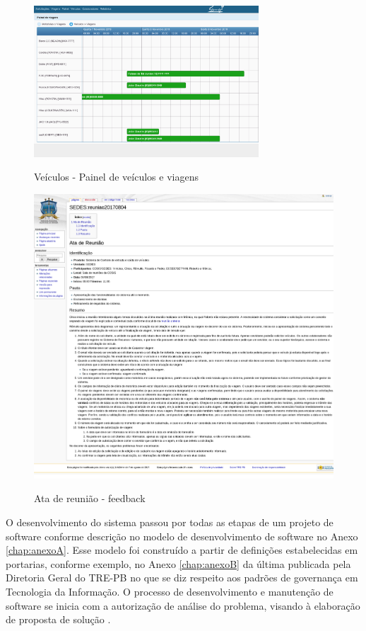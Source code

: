 \begin{figure}[!htb]
    \centering
    \caption{Veículos - Painel de veículos e viagens}
    \includegraphics[width=0.75\textwidth]{./dados/figuras/veiculos-tela2.png}
    \label{fig:figura-motoristas}
\end{figure}

\begin{figure}[!htb]
    \centering
    \caption{Ata de reunião - feedback}
    \includegraphics[width=1\textwidth]{./dados/figuras/veiculos-ata1.png}
    \label{fig:figura-ata1}
\end{figure}

O desenvolvimento do sistema passou por todas as etapas de um projeto de software conforme descrição no modelo de desenvolvimento de software no Anexo \ref{chap:anexoA}. Esse modelo foi construído a partir de definições estabelecidas em portarias, conforme exemplo, no Anexo \ref{chap:anexoB} da última publicada pela Diretoria Geral do TRE-PB no que se diz respeito aos padrões de governança em Tecnologia da Informação.
O processo de desenvolvimento e manutenção de software se inicia com a autorização de análise do problema, visando à elaboração de proposta de solução  \cite[p.~2]{Portaria37:2017}.
 


